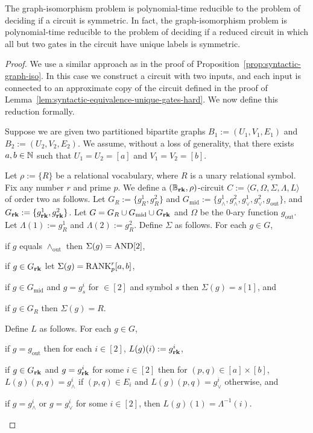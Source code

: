 \documentclass[../paper.tex]{subfiles}
\begin{document}
\begin{prop}
  The graph-isomorphism problem is polynomial-time reducible to the problem of
  deciding if a circuit is symmetric. In fact, the graph-isomorphism problem is
  polynomial-time reducible to the problem of deciding if a reduced circuit in
  which all but two gates in the circuit have unique labels is symmetric.
  \label{prop:graph-iso-symmetric}
\end{prop}
\begin{proof}
  We use a similar approach as in the proof of
  Proposition~\ref{prop:syntactic-graph-iso}. In this case we construct a
  circuit with two inputs, and each input is connected to an approximate copy of
  the circuit defined in the proof of
  Lemma~\ref{lem:syntactic-equivalence-unique-gates-hard}. We now define this
  reduction formally.
 
  Suppose we are given two partitioned bipartite graphs $B_1 := (U_1, V_1, E_1)$
  and $B_2 := (U_2, V_2, E_2)$. We assume, without a loss of generality, that
  there exists $a, b \in \mathbb{N}$ such that $U_1 = U_2 = [a]$ and $V_1 = V_2 =
  [b]$.

  Let $\rho:= \{R\}$ be a relational vocabulary, where $R$ is a unary relational
  symbol. Fix any number $r$ and prime $p$. We define a $(\mathbb{B}_{\text{\textbf{rk}}}, \rho)$-circuit $C
  := \langle G, \Omega, \Sigma, \Lambda, L \rangle$ of order two as follows. Let
  $G_{R} := \{g^1_{R}, g^2_{R}\}$ and $G_{\text{mid}} := \{g^1_{\land},
  g^2_\land, g^1_\lor, g^2_\lor , g_{\text{out}}\}$, and $G_{\text{\textbf{rk}}} : = \{
  g^1_{\text{\textbf{rk}}}, g^2_{\text{\textbf{rk}}}\}$. Let $G = G_R \cup G_{\text{mid}} \cup G_{\text{\textbf{rk}}}$
  and $\Omega$ be the $0$-ary function $g_{\text{out}}$. Let $\Lambda(1) :=
  g^1_{R}$ and $\Lambda(2) := g^2_{R}$. Define $\Sigma$ as follows. For each $g
  \in G$,
  \begin{myitemize}
  \item if $g$ equals $\land_{\text{out}}$ then $\Sigma(g) = \text{\upshape AND}[2]$,
  \item if $g \in G_{\text{\textbf{rk}}}$ let $\Sigma(g) = \text{\upshape RANK}^r_p [a,b]$,
  \item if $g \in G_{\text{mid}}$ and $g = g^i_s$ for $ \in [2]$ and symbol $s$
    then $\Sigma(g) = s[1]$, and
  \item if $g \in G_R$ then $\Sigma(g) = R$.
  \end{myitemize}
  Define $L$ as follows. For each $g \in G$,
  \begin{myitemize}
  \item if $g = g_{\text{out}}$ then for each $i \in [2]$, $L(g)(i) :=
    g^i_{\text{\textbf{rk}}}$,
  \item if $g \in G_{\text{\textbf{rk}}}$ and $g = g^i_{\text{\textbf{rk}}}$ for some $i \in [2]$ then for
    $(p,q) \in [a]\times [b]$, $L(g)(p,q) = g^i_\land$ if $(p,q) \in E_i$ and
    $L(g)(p,q) = g^i_\lor$ otherwise, and
  \item if $g = g^i_\land$ or $g = g^i_{\lor}$ for some $i \in [2]$, then
    $L(g)(1) = \Lambda^{-1}(i)$.
  \end{myitemize}


\end{proof}
\end{document}
